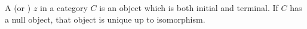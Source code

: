 A  (or ) $z$ in a category $C$ is an object which is both initial and terminal. If $C$ has a null object, that object is unique up to isomorphism.
